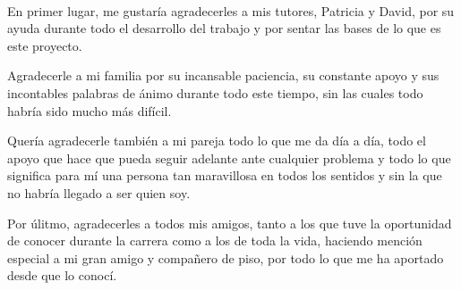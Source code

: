 \documentclass[11pt,a4paper,titlepage,oneside]{report}
\begin{document}
\setlength\arrayrulewidth{0.7pt}



\paxinaenbranco\
\begin{agradecementos}
  En primer lugar, me gustaría agradecerles a mis tutores, Patricia y David, por su ayuda durante todo el desarrollo del trabajo y por sentar
  las bases de lo que es este proyecto.

  Agradecerle a mi familia por su incansable paciencia, su constante apoyo y sus incontables
  palabras de ánimo durante todo este tiempo, sin las cuales todo habría sido mucho más difícil.

  Quería agradecerle también a mi pareja todo lo que me da día a día, todo el apoyo que hace que pueda
  seguir adelante ante cualquier problema y todo lo que significa para mí una persona tan maravillosa
  en todos los sentidos y sin la que no habría llegado a ser quien soy.

  Por úlitmo, agradecerles a todos mis amigos, tanto a los que tuve la oportunidad de conocer durante
  la carrera como a los de toda la vida, haciendo mención especial a mi gran amigo y compañero de
  piso, por todo lo que me ha aportado desde que lo conocí.
\end{agradecementos}


\setcounter{page}{1}

\tableofcontents
\listoffigures
\listoftables
\clearpage

\setcounter{page}{1}














\appendix



\clearpage
\end{document}

